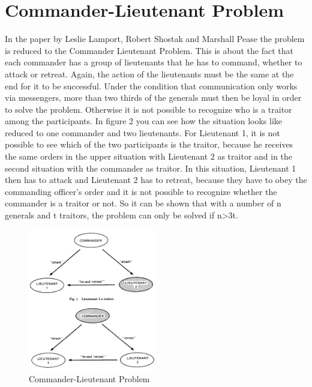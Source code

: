 \documentclass[12pt]{article}
\begin{document}
\section{Commander-Lieutenant Problem}
In the paper by Leslie Lamport, Robert Shostak and Marshall Pease \cite{orig paper} 
the problem is reduced to the Commander Lieutenant Problem. This is about the fact that each commander has a group of lieutenants that he has to command, whether to attack or retreat. Again, the action of the lieutenants must be the same at the end for it to be successful. Under the condition that communication only works via messengers, more than two thirds of the generals must then be loyal in order to solve the problem. Otherwise it is not possible to recognize who is a traitor among the participants. In figure 2 you can see how the situation looks like reduced to one commander and two lieutenants. For Lieutenant 1, it is not possible to see which of the two participants is the traitor, because he receives the same orders in the upper situation with Lieutenant 2 as traitor and in the second situation with the commander as traitor. In this situation, Lieutenant 1 then has to attack and Lieutenant 2 has to retreat, because they have to obey the commanding officer's order and it is not possible to recognize whether the commander is a traitor or not.
So it can be shown that with a number of n generals and t traitors, the problem can only be solved if n\textgreater3t.
\begin{figure}[htbp] 
  \centering
     \includegraphics[width=0.5\textwidth]{commanderLeutnant.PNG}
  \caption{Commander-Lieutenant Problem}
  \label{fig:Bild2}
\end{figure}
\end{document}
